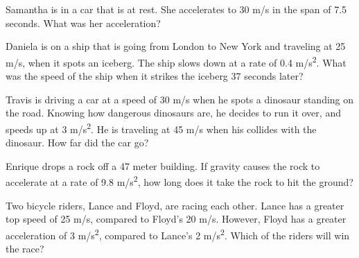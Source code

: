 \documentclass[11pt]{examdesign}
\begin{document}
\begin{multiplechoice} [title={Multiple Choice},
	rearrange=yes]

	
	\begin{question}
	
	Samantha is in a car that is at rest.  She accelerates to 30 m/s in the span of 7.5 seconds.  What was her acceleration?  

	\end{question}


\begin{question}
	Daniela is on a ship that is going from London to New York and traveling at 25 m/s, when it spots an iceberg.  The ship slows down at a rate of 0.4 m/s\textsuperscript{2}.  What was the speed of the ship when it strikes the iceberg 37 seconds later?  
	\choice {6.9 m/s}
	\choice [!]{10.2 m/s}
	\choice {39.8 m/s}
	\choice {255.3 m/s}
\end{question}

	\begin{question}
	Travis is driving a car at a speed of 30 m/s when he spots a dinosaur standing on the road. Knowing how dangerous dinosaurs are, he decides to run it over, and speeds up at 3 m/s\textsuperscript{2}. He is traveling at 45 m/s when his collides with the dinosaur.  How far did the car go? 
\end{question}


	\begin{question}
	Enrique drops a rock off a 47 meter building.  If gravity causes the rock to accelerate at a rate of 9.8 m/s\textsuperscript{2}, how long does it take the rock to hit the ground?
\end{question}


\begin{question}
	Two bicycle riders, Lance and Floyd, are racing each other. Lance has a greater top speed of 25 m/s, compared to Floyd's 20 m/s.  However, Floyd has a greater acceleration of 3 m/s\textsuperscript{2}, compared to Lance's 2 m/s\textsuperscript{2}.  Which of the riders will win the race?
	

\end{question}
\end{multiplechoice}
\end{document}
